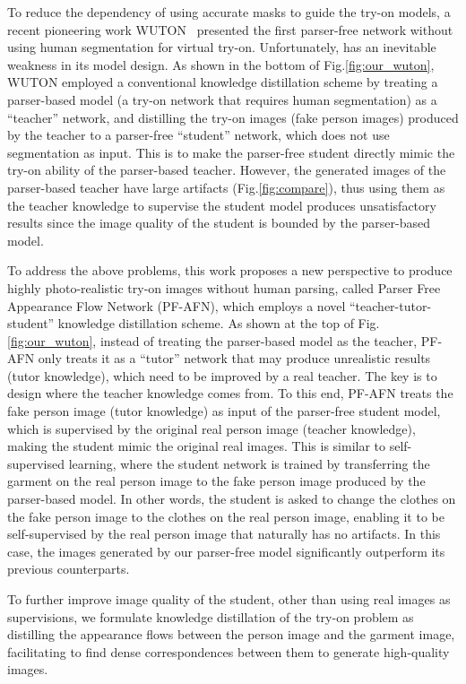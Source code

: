 \documentclass[final]{cvpr}
\begin{document}
	To reduce the dependency of using accurate masks to guide the try-on models, a recent pioneering work WUTON~\cite{parser_free} presented the first parser-free network without using human segmentation for virtual try-on.
Unfortunately, \cite{parser_free} has an inevitable weakness in its model design. 
As shown in the bottom of Fig.\ref{fig:our_wuton}, WUTON employed a conventional knowledge distillation scheme by 
	treating a parser-based model (\ie a try-on network that requires human segmentation) as a ``teacher'' network, and distilling the try-on images (\ie fake person images) produced by the teacher to a parser-free ``student'' network, which does not use segmentation as input. This is to make the parser-free student directly mimic the try-on ability of the parser-based teacher.
However, the generated images of the parser-based teacher have large artifacts (Fig.\ref{fig:compare}), thus using them as the teacher knowledge to supervise the student model produces unsatisfactory results since the image quality of the student is bounded by the parser-based model.
	
To address the above problems, this work proposes a new perspective to produce highly photo-realistic try-on images without human parsing, called Parser Free Appearance Flow Network (PF-AFN), which employs a novel ``teacher-tutor-student'' knowledge distillation scheme.
As shown at the top of Fig.\ref{fig:our_wuton}, instead of treating the parser-based model as the teacher,  PF-AFN only treats it as a ``tutor'' network that may produce unrealistic results (\ie tutor knowledge), which need to be improved by a real teacher.
The key is to design where the teacher knowledge comes from.
To this end, PF-AFN treats the fake person image (tutor knowledge) as input of the parser-free student model, which is supervised by the original real person image (teacher knowledge), making the student mimic the original real images.
This is similar to self-supervised learning, where the student network is trained by transferring the garment on the real person image to the fake person image produced by the parser-based model. In other words, the student is asked to change the clothes on the fake person image to the clothes on the real person image, enabling it to be self-supervised by the real person image that naturally has no artifacts. In this case, the images generated by our parser-free model significantly outperform its previous counterparts.
	
	
	To further improve image quality of the student, other than using real images as supervisions, we formulate knowledge distillation of the try-on problem as distilling the appearance flows between the person image and the garment image, facilitating to find dense  correspondences between them to generate high-quality images.
	
\end{document}
